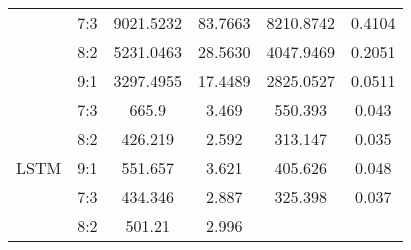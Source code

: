 \documentclass{ieeeojies}
\begin{document}
{\begin{table}[H]
\begin{tabular}{|cccccc|}
\multicolumn{1}{|c|}{\cellcolor[HTML]{E6EFFD}} &
  \multicolumn{1}{c|}{\cellcolor[HTML]{E6EFFD}7:3} &
  \multicolumn{1}{c|}{\cellcolor[HTML]{E6EFFD}9021.5232} &
  \multicolumn{1}{c|}{\cellcolor[HTML]{E6EFFD}83.7663} &
  \multicolumn{1}{c|}{\cellcolor[HTML]{E6EFFD}8210.8742} &
  0.4104 \\ \cline{2-6} 
\rowcolor[HTML]{E6EFFD} 
\multicolumn{1}{|c|}{\cellcolor[HTML]{E6EFFD}} &
  \multicolumn{1}{c|}{\cellcolor[HTML]{E6EFFD}8:2} &
  \multicolumn{1}{c|}{\cellcolor[HTML]{E6EFFD}5231.0463} &
  \multicolumn{1}{c|}{\cellcolor[HTML]{E6EFFD}28.5630} &
  \multicolumn{1}{c|}{\cellcolor[HTML]{E6EFFD}4047.9469} &
  0.2051 \\ \cline{2-6} 
\rowcolor[HTML]{E6EFFD} 
\multicolumn{1}{|c|}{\multirow{-3}{*}{\cellcolor[HTML]{E6EFFD}SARIMA}} &
  \multicolumn{1}{c|}{\cellcolor[HTML]{E6EFFD}9:1} &
  \multicolumn{1}{c|}{\cellcolor[HTML]{E6EFFD}3297.4955} &
  \multicolumn{1}{c|}{\cellcolor[HTML]{E6EFFD}17.4489} &
  \multicolumn{1}{c|}{\cellcolor[HTML]{E6EFFD}2825.0527} &
  0.0511 \\ \hline
\multicolumn{1}{|c|}{} &
  \multicolumn{1}{c|}{7:3} &
  \multicolumn{1}{c|}{\cellcolor[HTML]{FFFFFF}665.9} &
  \multicolumn{1}{c|}{\cellcolor[HTML]{FFFFFF}3.469} &
  \multicolumn{1}{c|}{\cellcolor[HTML]{FFFFFF}550.393} &
  \cellcolor[HTML]{FFFFFF}0.043 \\ \cline{2-6} 
\multicolumn{1}{|c|}{} &
  \multicolumn{1}{c|}{8:2} &
  \multicolumn{1}{c|}{\cellcolor[HTML]{FFFFFF}426.219} &
  \multicolumn{1}{c|}{\cellcolor[HTML]{FFFFFF}2.592} &
  \multicolumn{1}{c|}{\cellcolor[HTML]{FFFFFF}313.147} &
  \cellcolor[HTML]{FFFFFF}0.035 \\ \cline{2-6} 
\multicolumn{1}{|c|}{\multirow{-3}{*}{LSTM}} &
  \multicolumn{1}{c|}{9:1} &
  \multicolumn{1}{c|}{\cellcolor[HTML]{FFFFFF}551.657} &
  \multicolumn{1}{c|}{\cellcolor[HTML]{FFFFFF}3.621} &
  \multicolumn{1}{c|}{\cellcolor[HTML]{FFFFFF}405.626} &
  \cellcolor[HTML]{FFFFFF}0.048 \\ \hline
\rowcolor[HTML]{E6EFFD} 
\multicolumn{1}{|c|}{\cellcolor[HTML]{E6EFFD}} &
  \multicolumn{1}{c|}{\cellcolor[HTML]{E6EFFD}7:3} &
  \multicolumn{1}{c|}{\cellcolor[HTML]{E6EFFD}434.346} &
  \multicolumn{1}{c|}{\cellcolor[HTML]{E6EFFD}2.887} &
  \multicolumn{1}{c|}{\cellcolor[HTML]{E6EFFD}325.398} &
  0.037 \\ \cline{2-6} 
\rowcolor[HTML]{E6EFFD} 
\multicolumn{1}{|c|}{\cellcolor[HTML]{E6EFFD}} &
  \multicolumn{1}{c|}{\cellcolor[HTML]{E6EFFD}8:2} &
  \multicolumn{1}{c|}{\cellcolor[HTML]{E6EFFD}501.21} &
  \multicolumn{1}{c|}{\cellcolor[HTML]{E6EFFD}2.996} &

\end{tabular}
\end{table}}
\end{document}
